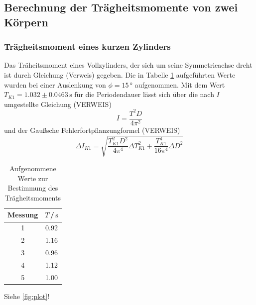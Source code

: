 \subsection{Berechnung der Trägheitsmomente von zwei Körpern}

\subsubsection{Trägheitsmoment eines kurzen Zylinders}

Das Träheitsmoment eines Vollzylinders, der sich um seine Symmetrieachse dreht ist durch 
Gleichung (Verweis) gegeben. Die in Tabelle \ref{tab:a4} aufgeführten Werte wurden bei einer 
Auslenkung von $\phi = 15\,°$ aufgenommen. Mit dem Wert $T_{K1} = 1.032 \pm 0.0463\, \si{\second}$
für die Periodendauer lässt sich über die nach $I$ umgestellte Gleichung (VERWEIS)
\begin{equation}
    I = \frac{T^2 D}{4 \pi^2}
\end{equation}
und der Gaußsche Fehlerfortpflanzungformel (VERWEIS)
\begin{equation} 
    \Delta I_{K1} = \sqrt{\frac{T_{K1}^2 D^2}{4 \pi^4}\Delta T_{K1}^2 + \frac{T_{K1}^4}{16 \pi^4}\Delta D^2} 
\end{equation}



\begin{table}[H]
\normalsize

\centering
{}
\begin{tabular}{c c}
\toprule
    Messung  & $T$\,/\,$\si{\second}$ \\
    \midrule

1  &   0.92   \\
2  &   1.16   \\
3  &   0.96   \\
4  &   1.12   \\
5  &   1.00   \\

    \bottomrule
\end{tabular}
\caption{Aufgenommene Werte zur Bestimmung des Trägheitsmoments}
\label{tab:a4}
\end{table}













Siehe \autoref{fig:plot}!
